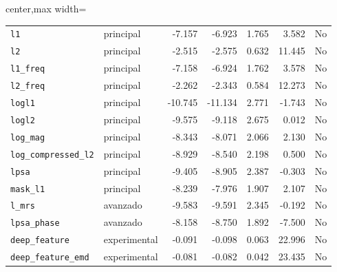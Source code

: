 \begin{table}[H]
\begin{adjustbox}{center,max width=\textwidth}
\begin{tabular}{llrrrrc}
            \texttt{l1}                  & principal    & -7.157  & -6.923  & 1.765 & 3.582  & No \\
            \texttt{l2}                  & principal    & -2.515  & -2.575  & 0.632 & 11.445 & No \\
            \texttt{l1\_freq}            & principal    & -7.158  & -6.924  & 1.762 & 3.578  & No \\
            \texttt{l2\_freq}            & principal    & -2.262  & -2.343  & 0.584 & 12.273 & No \\
            \texttt{logl1}               & principal    & -10.745 & -11.134 & 2.771 & -1.743 & No \\
            \texttt{logl2}               & principal    & -9.575  & -9.118  & 2.675 & 0.012  & No \\
            \texttt{log\_mag}            & principal    & -8.343  & -8.071  & 2.066 & 2.130  & No \\
            \texttt{log\_compressed\_l2} & principal    & -8.929  & -8.540  & 2.198 & 0.500  & No \\
            \texttt{lpsa}                & principal    & -9.405  & -8.905  & 2.387 & -0.303 & No \\
            \texttt{mask\_l1}            & principal    & -8.239  & -7.976  & 1.907 & 2.107  & No \\
            \texttt{l\_mrs}              & avanzado     & -9.583  & -9.591  & 2.345 & -0.192 & No \\
            \texttt{lpsa\_phase}         & avanzado     & -8.158  & -8.750  & 1.892 & -7.500 & No \\
            \texttt{deep\_feature}       & experimental & -0.091  & -0.098  & 0.063 & 22.996 & No \\
            \texttt{deep\_feature\_emd}  & experimental & -0.081  & -0.082  & 0.042 & 23.435 & No \\

            \bottomrule
        \end{tabular}
    \end{adjustbox}
\end{table}

